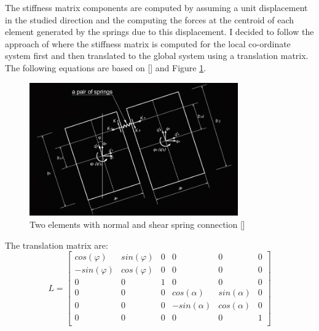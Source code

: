 The stiffness matrix components are computed by assuming a unit displacement in the studied direction and the computing the forces at the centroid of each element generated by the springs due to this displacement.  I decided to follow the approach of \cite{Blog_python_AEM} where the stiffness matrix is computed for the local co-ordinate system first and then translated to the global system using a translation matrix.  The following equations are based on [\cite{Blog_python_AEM}] and Figure \ref{fig:stiffness_matrix_elements}.  

\begin{figure}[H]
\centering
\includegraphics[width=0.8\textwidth]{../stiffness_matrix_elements.jpg}
\caption{Two elements with normal and shear spring connection [\cite{Blog_python_AEM}]}
\label{fig:stiffness_matrix_elements}
\end{figure}


The translation matrix are:
\begin{equation}
L = 
\begin{bmatrix}
cos(\varphi) & sin (\varphi) & 0 & 0 & 0 & 0 \\
- sin (\varphi) & cos (\varphi) & 0 & 0 & 0 & 0 \\
0 & 0 & 1 & 0 & 0 & 0 \\
0 & 0 & 0 & cos (\alpha) & sin (\alpha) & 0 \\
0 & 0 & 0 & - sin (\alpha) & cos (\alpha) & 0 \\
0 & 0 & 0 & 0 & 0 & 1 \\
\end{bmatrix}
\end{equation}

